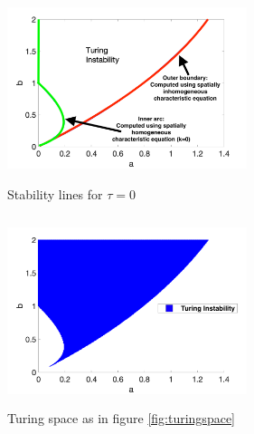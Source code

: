 \begin{figure}[H]
    \centering
    \begin{subfigure}[b]{0.47\textwidth}
        \centering
        \includegraphics[width=7cm,height = 5.5cm]{bif0.png}
        \caption{Stability lines for $\tau=0$}
        \label{fig:bif0}
    \end{subfigure}
    \hfill
    \begin{subfigure}[b]{0.47\textwidth}
        \centering
        \includegraphics[width=7cm,height = 5.5cm]{turingspace.png}
        \caption{Turing space as in figure \ref{fig:turingspace}}
        \label{}
    \end{subfigure}
    \caption{}
    \label{fig:tspace1}
\end{figure}

